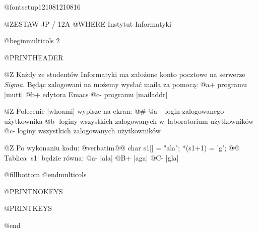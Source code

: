 



@fontsetup{12}{10}{8}{12}{10}{8}{16}

@ZESTAW JP / 12A
@WHERE  Instytut Informatyki

@beginmulticols 2

@PRINTHEADER

@Z Każdy ze studentów Informatyki ma założone konto pocztowe na
   serwerze {\it Sigma}. 
   Będąc zalogowani na  możemy wysłać maila za
   pomocą:
@a+  programu |mutt|
@b+  edytora Emacs
@c-  programu |mailaddr|

@Z Polecenie |whoami| wypisze na ekran:
@#
@a+ login zalogowanego użytkownika
@b- loginy wszystkich zalogowanych w~laboratorium użytkowników
@c- loginy wszystkich zalogowanych użytkowników

@Z Po wykonaniu kodu:
@verbatim@@
char s1[] = "ala";
*(s1+1) = 'g';
@@
Tablica |s1| będzie równa:
@a- |ala|
@B+ |aga|
@C- |gla|

@fillbottom
@endmulticols

@PRINTNOKEYS

@PRINTKEYS

@end
